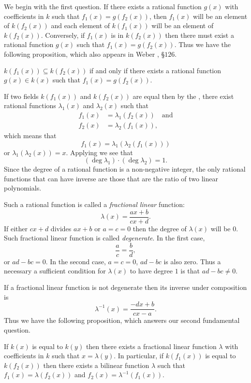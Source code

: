 We begin with the first question.  If there exists a rational function
$g(x)$ with coefficients in $k$ such that $f_1(x) = g(f_2(x))$, then
$f_1(x)$ will be an element of $k(f_2(x))$ and each element of
$k(f_1(x))$ will be an element of $k(f_2(x))$.  Conversely, if
$f_1(x)$ is in $k(f_2(x))$ then there must exist a rational function
$g(x)$ such that $f_1(x) = g(f_2(x))$.  Thus we have the following
proposition, which also appears in Weber \cite{Weber1961-tf},
\S$126$.

\begin{proposition} \label{Luroth:Subfield:Prop}
$k(f_1(x)) \subseteq k(f_2(x))$ if and only if there exists a rational
function $g(x) \in k(x)$ such that $f_1(x) = g(f_2(x))$.
\end{proposition}

If two fields $k(f_1(x))$ and $k(f_2(x))$ are equal then by the
, there exist rational functions $\lambda_1(x)$ and
$\lambda_2(x)$ such that
\[
\begin{aligned}
f_1(x) & = \lambda_1(f_2(x))\quad \mbox{and}\\
f_2(x) & = \lambda_2(f_1(x)),
\end{aligned}
\]
which means that
\[
f_1(x) = \lambda_1(\lambda_2(f_1(x)))
\]
or $\lambda_1(\lambda_2(x)) = x$.  Applying
 we see that 
\[
(\deg \lambda_1) \cdot (\deg \lambda_2) = 1.
\]
Since the degree of a rational function is a non-negative integer, the
only rational functions that can have inverse are those that are the
ratio of two linear polynomials.  

Such a rational function is called a {\em fractional linear} function:
\[
\lambda(x) = \frac{a x + b}{c x + d}.
\]
If either $cx+d$ divides $ax+b$ or $a=c=0$ then the degree of
$\lambda(x)$ will be $0$.  Such fractional linear function is called
{\em degenerate\/}.  In the first case,
\[
\frac{a}{c} = \frac{b}{d},
\]
or $ad - bc = 0$.  In the second case, $a=c=0$, $ad -bc$ is also zero.
Thus a necessary a sufficient condition for $\lambda(x)$ to have
degree $1$ is that $ad-bc \not=0$.  

If a fractional linear function is not degenerate then its inverse
under composition is
\[
\lambda^{-1}(x) = \frac{-dx + b}{cx - a}.
\]
Thus we have the following proposition, which answers our second
fundamental question.

\begin{proposition}\label{Bilinear:Inverse:Prop}
If $k(x)$ is equal to $k(y)$ then there exists a fractional linear
function $\lambda$ with coefficients in $k$ such that $x =
\lambda(y)$.  In particular, if $k(f_1(x))$ is equal to $k(f_2(x))$
then there exists a bilinear function $\lambda$ such that $f_1(x) =
\lambda(f_2(x))$ and $f_2(x) = \lambda^{-1}(f_1(x))$.
\end{proposition}

